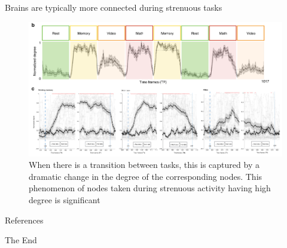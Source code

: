 \documentclass{beamer}
\begin{document}
\begin{frame}{Brains are typically more connected during strenuous tasks}
    \begin{figure}
        \includegraphics[width = 0.85\linewidth]{fig5b.png}
        \caption{When there is a transition between tasks, this is captured by a dramatic change in the degree of the corresponding nodes. This phenomenon of nodes taken during strenuous activity having high degree is significant}
    \end{figure}
\end{frame}

\begin{frame}{}
    
\end{frame}

\begin{frame}{}
    
\end{frame}

\begin{frame}[allowframebreaks]{References}
\printbibliography
\end{frame}


\begin{frame}
\Huge{\centerline{The End}}
\end{frame}

\end{document}
